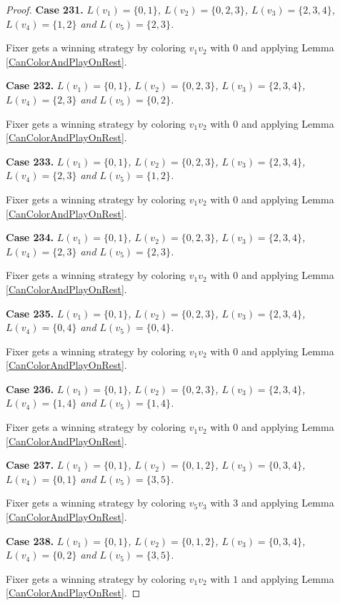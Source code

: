 \documentclass[12pt]{amsart}
\theoremstyle{plain}
\theoremstyle{definition}
\theoremstyle{remark}
\begin{document}
\begin{proof}
\noindent\textbf{Case 231.  }\textit{$L(v_1) = \{0, 1\}$, $L(v_2) = \{0, 2, 3\}$, $L(v_3) = \{2, 3, 4\}$, $L(v_4) = \{1, 2\}$ and $L(v_5) = \{2, 3\}$.}

Fixer gets a winning strategy by coloring $v_1v_2$ with $0$ and applying Lemma \ref{CanColorAndPlayOnRest}.

\noindent\textbf{Case 232.  }\textit{$L(v_1) = \{0, 1\}$, $L(v_2) = \{0, 2, 3\}$, $L(v_3) = \{2, 3, 4\}$, $L(v_4) = \{2, 3\}$ and $L(v_5) = \{0, 2\}$.}

Fixer gets a winning strategy by coloring $v_1v_2$ with $0$ and applying Lemma \ref{CanColorAndPlayOnRest}.

\noindent\textbf{Case 233.  }\textit{$L(v_1) = \{0, 1\}$, $L(v_2) = \{0, 2, 3\}$, $L(v_3) = \{2, 3, 4\}$, $L(v_4) = \{2, 3\}$ and $L(v_5) = \{1, 2\}$.}

Fixer gets a winning strategy by coloring $v_1v_2$ with $0$ and applying Lemma \ref{CanColorAndPlayOnRest}.

\noindent\textbf{Case 234.  }\textit{$L(v_1) = \{0, 1\}$, $L(v_2) = \{0, 2, 3\}$, $L(v_3) = \{2, 3, 4\}$, $L(v_4) = \{2, 3\}$ and $L(v_5) = \{2, 3\}$.}

Fixer gets a winning strategy by coloring $v_1v_2$ with $0$ and applying Lemma \ref{CanColorAndPlayOnRest}.

\noindent\textbf{Case 235.  }\textit{$L(v_1) = \{0, 1\}$, $L(v_2) = \{0, 2, 3\}$, $L(v_3) = \{2, 3, 4\}$, $L(v_4) = \{0, 4\}$ and $L(v_5) = \{0, 4\}$.}

Fixer gets a winning strategy by coloring $v_1v_2$ with $0$ and applying Lemma \ref{CanColorAndPlayOnRest}.

\noindent\textbf{Case 236.  }\textit{$L(v_1) = \{0, 1\}$, $L(v_2) = \{0, 2, 3\}$, $L(v_3) = \{2, 3, 4\}$, $L(v_4) = \{1, 4\}$ and $L(v_5) = \{1, 4\}$.}

Fixer gets a winning strategy by coloring $v_1v_2$ with $0$ and applying Lemma \ref{CanColorAndPlayOnRest}.

\noindent\textbf{Case 237.  }\textit{$L(v_1) = \{0, 1\}$, $L(v_2) = \{0, 1, 2\}$, $L(v_3) = \{0, 3, 4\}$, $L(v_4) = \{0, 1\}$ and $L(v_5) = \{3, 5\}$.}

Fixer gets a winning strategy by coloring $v_5v_3$ with $3$ and applying Lemma \ref{CanColorAndPlayOnRest}.

\noindent\textbf{Case 238.  }\textit{$L(v_1) = \{0, 1\}$, $L(v_2) = \{0, 1, 2\}$, $L(v_3) = \{0, 3, 4\}$, $L(v_4) = \{0, 2\}$ and $L(v_5) = \{3, 5\}$.}

Fixer gets a winning strategy by coloring $v_1v_2$ with $1$ and applying Lemma \ref{CanColorAndPlayOnRest}.


\end{proof}
\end{document}
